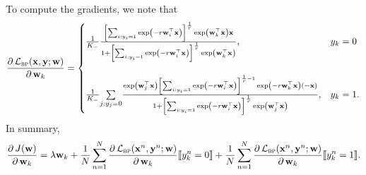 \documentclass[9pt]{extarticle}
\newcommand{\llb}{\llbracket}
\newcommand{\rrb}{\rrbracket}
\newcommand{\x}{\mathbf{x}}
\newcommand{\y}{\mathbf{y}}
\newcommand{\1}{\mathbf{1}}
\newcommand{\w}{\mathbf{w}}
\newcommand{\LCal}{\mathcal{L}}
\begin{document}
To compute the gradients, we note that
$$
\frac{\partial \, \LCal_\textsc{bp}(\x, \y; \w)} {\partial \, \w_k} 
= \begin{cases}
  \frac{1}{K_-} 
  \frac{\left[ \sum_{i:y_i=1} \exp \left( -r \w_i^\top \x \right) \right]^\frac{1}{r} \exp \left( \w_k^\top \x \right) \x}
       {1 + \left[ \sum_{i:y_i=1} \exp \left( -r \w_i^\top \x \right) \right]^\frac{1}{r} \exp \left( \w_k^\top \x \right)}, & y_k = 0 \\ \\
  \frac{1}{K_-} \underset{j:y_j=0}{\sum}
  \frac{\exp \left( \w_j^\top \x \right) 
        \left[ \sum_{i:y_i=1} \exp \left( -r \w_i^\top \x \right) \right]^{\frac{1}{r}-1}
        \exp \left( -r \w_k^\top \x \right) (-\x) }
       {1 + \left[ \sum_{i:y_i=1} \exp \left( -r \w_i^\top \x \right) \right]^\frac{1}{r} \exp \left( \w_j^\top \x \right)}, & y_k = 1.
  \end{cases}
$$
In summary,
$$
\frac{\partial \, J(\w)} {\partial \, \w_k}
=\lambda \w_k + 
 \frac{1}{N} \sum_{n=1}^N
 \frac{\partial \, \LCal_\textsc{bp}(\x^n, \y^n; \w)} {\partial \, \w_k} \llb y_k^n = 0 \rrb + 
 \frac{1}{N} \sum_{n=1}^N
 \frac{\partial \, \LCal_\textsc{bp}(\x^n, \y^n; \w)} {\partial \, \w_k} \llb y_k^n = 1 \rrb.
$$





\clearpage
\newpage 
\appendix


\newpage


%

%

%



%
%


\end{document}
